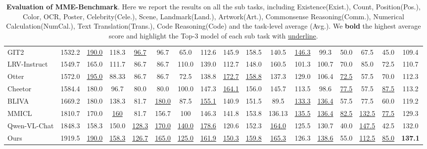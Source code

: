 \documentclass[10pt,twocolumn,letterpaper]{article}
\begin{document}
\begin{table*}[t]
{\begin{tabular}{lcccccccccccccccc}
GIT2\cite{Wang2022GITAG} & 1532.2 & \underline{190.0} & 118.3 & \underline{96.7} & 96.7 & 65.0 & 112.6 & 145.9 & 158.5 & 140.5 & \underline{146.3} & 99.3 & 50.0 & 67.5 & 45.0 & 109.4\\

LRV-Instruct\cite{Liu2023MitigatingHI} & 1549.7 & 165.0 & 111.7 & 86.7 & 86.7 & 110.0 & 139.0 & 112.7 & 148.0 & 160.5 & 101.3 &100.7 & 70.0 & 85.0 & 72.5 & 110.7\\

Otter\cite{li2023otter} & 1572.0 & \underline{195.0} & 88.33& 86.7 & 86.7 & 72.5 & 138.8 & \underline{172.7} & \underline{158.8} & 137.3 & 129.0 & 106.4 & \underline{72.5} & 57.5 & 70.0 & 112.3\\

Cheetor\cite{Li2023EmpoweringVM} & 1584.4 & 180.0 & 96.7 & 80.0 & 80.0 & 100.0 & 147.3 & \underline{164.1} & 156.0 & 145.7 & 113.5 &98.6 & \underline{77.5} & 57.5 & \underline{87.5} & 113.2 \\

BLIVA\cite{Hu2023BLIVAAS}  & 1669.2 & 180.0 & 138.3 & 81.7 & \underline{180.0} & 87.5& \underline{155.1} & 140.9 & 151.5 & 89.5 & \underline{133.3}  & \underline{136.4} & 57.5 & 77.5 & 60.0 & 119.2 \\

MMICL\cite{Zhao2023MMICLEV} & 1810.7 &170.0 & \underline{160} & 81.7 & 156.7  & 100 & 146.3 & 141.8 & 153.8 & 136.13 & \underline{135.5} & \underline{136.4} & \underline{82.5}	&\underline{132.5} & \underline{77.5} & 129.3 \\


Qwen-VL-Chat\cite{bai2023qwen} & 1848.3 & 158.3 & 150.0 & \underline{128.3} & \underline{170.0} & \underline{140.0}& \underline{178.6} & 120.6 & 152.3 & \underline{164.0} & 125.5  & 130.7 & 40.0 & \underline{147.5} & 42.5 & 132.0 \\

\midrule

\rowcolor{gray!20} Ours & 1919.5 & \underline{190.0} & \underline{158.3} & \underline{126.7} & \underline{165.0} & \underline{125.0} & \underline{161.9} & \underline{150.3} & \underline{159.8} & \underline{165.3} & 126.3 & \underline{138.6} & 55.0 & \underline{112.5} & \underline{85.0} & \textbf{137.1}  \\

\bottomrule
\end{tabular}}
\vspace{-5pt}
\caption{
\textbf{Evaluation of MME-Benchmark}. Here we report the results on all the sub tasks, including Existence(Exist.), Count, Position(Pos.), Color, OCR, Poster, Celebrity(Cele.), Scene, Landmark(Land.), Artwork(Art.), Commonsense Reasoning(Comm.), Numerical Calculation(NumCal.), Text Translation(Trans.), Code Reasoning(Code) and the task-level average (Avg.). We \textbf{bold} the highest average score and highlight the Top-3 model of each sub task with \underline{underline}. }
\vspace{1.5 pt}
\label{table:mme}
\end{table*}
\end{document}
